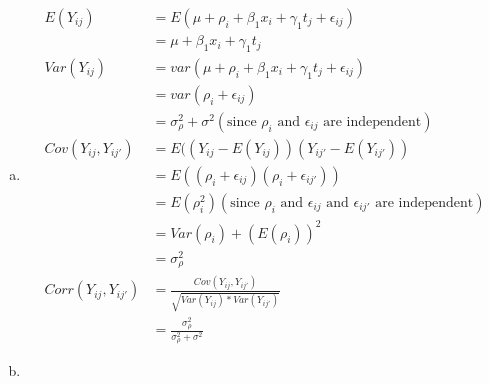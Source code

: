 \documentclass{article}\usepackage[]{graphicx}\usepackage[]{color}
\begin{document}
\begin{enumerate}[(a)]

\item

\begin{displaymath}
\begin{split}
  E(Y_{ij}) &= E(\mu + \rho_i + \beta_1 x_i + \gamma_1 t_j + \epsilon_{ij})\\
            &= \mu + \beta_1 x_i + \gamma_1 t_j \\
  Var(Y_{ij}) &= var(\mu + \rho_i + \beta_1 x_i + \gamma_1 t_j + \epsilon_{ij})\\
              &= var(\rho_i + \epsilon_{ij}) \\
              &= \sigma^2_\rho +\sigma^2 (\text{since $\rho_i$ and $\epsilon_{ij}$ are independent} )\\
  Cov(Y_{ij}, Y_{ij'}) &= E((Y_{ij}-E(Y_{ij}))(Y_{ij'}-E(Y_{ij'}))\\
                       &= E((\rho_i+\epsilon_{ij})(\rho_i+\epsilon_{ij'})) \\
                       &= E(\rho_i^2) (\text{since $\rho_i$ and $\epsilon_{ij}$ and $\epsilon_{ij'}$ are independent} )\\
                       &= Var(\rho_i) + (E(\rho_i))^2\\
                       &= \sigma^2_\rho\\
  Corr(Y_{ij}, Y_{ij'}) &= \frac{Cov(Y_{ij}, Y_{ij'})}{\sqrt{Var(Y_{ij}) * Var(Y_{ij'})}} \\
                        &= \frac{\sigma^2_\rho}{\sigma^2_\rho +\sigma^2}
\end{split}
\end{displaymath}

\item


\end{enumerate}
\end{document}
